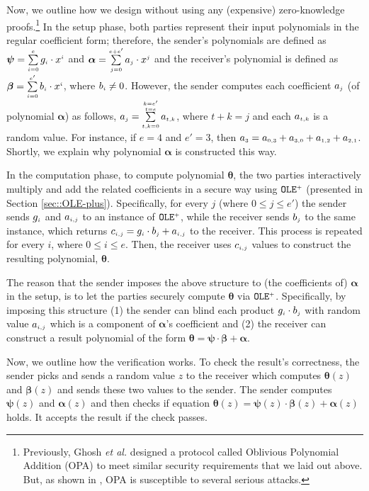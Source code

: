 Now, we outline how we design \vopr without using any (expensive) zero-knowledge proofs.\footnote{Previously, Ghosh \textit{et al.}  \cite{GhoshN19} designed a protocol called Oblivious Polynomial Addition (OPA) to meet similar security requirements that we laid out above. But, as shown in \cite{AbadiMZ21}, OPA  is susceptible to several serious attacks. } In the setup phase, both parties represent their input polynomials in the regular coefficient form; therefore, the sender's polynomials are defined as $\bm\psi=\sum\limits^{\scriptscriptstyle e}_{\scriptscriptstyle i=0}g_{\scriptscriptstyle i}\cdot x^{\scriptscriptstyle i}$ and  $\bm\alpha=\sum\limits^{\scriptscriptstyle e+e'}_{\scriptscriptstyle j=0}a_{\scriptscriptstyle j}\cdot x^{\scriptscriptstyle j}$ and the receiver's polynomial is defined as $\bm\beta=\sum\limits^{\scriptscriptstyle e'}_{\scriptscriptstyle i=0}b_{\scriptscriptstyle i}\cdot x^{\scriptscriptstyle i}$, where $b_{\scriptscriptstyle i}\neq 0$. However, the sender computes each coefficient $a_{\scriptscriptstyle j}$ (of polynomial $\bm \alpha$) as follows,  $a_{\scriptscriptstyle j}=\sum\limits^{\substack{\scriptscriptstyle k=e'\\ \scriptscriptstyle t=e}}_{\scriptscriptstyle t,k=0} a_{\scriptscriptstyle t,k}$,  where  $t+k=j$ and each $a_{\scriptscriptstyle t,k}$ is a random value. For instance, if $e=4$ and $e'=3$, then $a_{\scriptscriptstyle 3}=a_{\scriptscriptstyle \scriptscriptstyle 0,3}+a_{\scriptscriptstyle 3,0}+a_{\scriptscriptstyle 1,2}+a_{\scriptscriptstyle 2,1}$. Shortly, we explain why polynomial $\bm\alpha$ is constructed this way. 



In the computation phase,  to compute polynomial $\bm\theta$, the two parties interactively multiply and add the related coefficients in a secure way using $\mathtt{OLE}^{\scriptscriptstyle +}$ (presented in Section \ref{sec::OLE-plus}). Specifically,
%
%
for every $j$  (where $0\leq j\leq e'$) the sender sends $g_{\scriptscriptstyle i}$ and $a_{\scriptscriptstyle i,j}$ to an instance of  $\mathtt{OLE}^{\scriptscriptstyle +}$, while the receiver sends $b_{\scriptscriptstyle j}$ to the same instance,  which returns $c_{\scriptscriptstyle i,j}=g_{\scriptscriptstyle i}\cdot b_{\scriptscriptstyle j}+ a_{\scriptscriptstyle i,j}$ to the receiver. This process is repeated for every $i$, where $0 \leq i \leq e$. Then, the receiver uses $c_{\scriptscriptstyle i,j}$ values to construct the resulting polynomial, $\bm\theta$.  


The reason that the sender imposes the above structure to (the coefficients of)  $\bm\alpha$ in the setup, is to let the parties securely compute $\bm\theta$ via  $\mathtt{OLE}^{\scriptscriptstyle +}$. Specifically, by imposing this structure (1) the sender  can blind each product $g_{\scriptscriptstyle i}\cdot b_{\scriptscriptstyle j}$  with  random value $a_{\scriptscriptstyle i,j}$ which is a component of $\bm\alpha$'s coefficient and (2) the receiver can construct a result polynomial of the form $\bm\theta=\bm\psi\cdot \bm\beta+\bm\alpha$. 


Now, we outline how the verification works. To check the result's correctness, the sender picks and sends a random value $z$ to the receiver which computes  $\bm\theta(z)$ and $\bm\beta(z)$ and sends these two values  to the sender. The sender computes  $\bm\psi(z)$ and $\bm\alpha(z)$ and then checks if equation  $\bm\theta({ z})=\bm\psi({ z})\cdot \bm\beta({ z})+\bm\alpha({ z})$ holds. It accepts the result if the check passes.   


